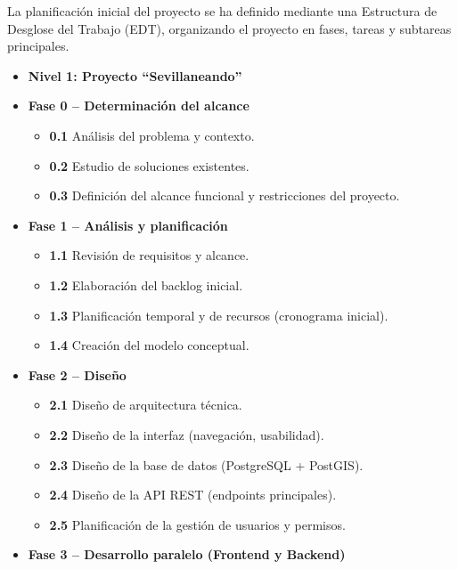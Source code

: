 La planificación inicial del proyecto se ha definido mediante una Estructura de Desglose del Trabajo (EDT), organizando el proyecto en fases, tareas y subtareas principales.

\begin{itemize}
    \item \textbf{Nivel 1: Proyecto ``Sevillaneando''}

    \item \textbf{Fase 0 -- Determinación del alcance}
    \begin{itemize}
        \item \textbf{0.1} Análisis del problema y contexto.
        \item \textbf{0.2} Estudio de soluciones existentes.
        \item \textbf{0.3} Definición del alcance funcional y restricciones del proyecto.
    \end{itemize}

    \item \textbf{Fase 1 -- Análisis y planificación}
    \begin{itemize}
        \item \textbf{1.1} Revisión de requisitos y alcance.
        \item \textbf{1.2} Elaboración del backlog inicial.
        \item \textbf{1.3} Planificación temporal y de recursos (cronograma inicial).
        \item \textbf{1.4} Creación del modelo conceptual.
    \end{itemize}

    \item \textbf{Fase 2 -- Diseño}
    \begin{itemize}
        \item \textbf{2.1} Diseño de arquitectura técnica.
        \item \textbf{2.2} Diseño de la interfaz (navegación, usabilidad).
        \item \textbf{2.3} Diseño de la base de datos (PostgreSQL + PostGIS).
        \item \textbf{2.4} Diseño de la API REST (endpoints principales).
        \item \textbf{2.5} Planificación de la gestión de usuarios y permisos.
    \end{itemize}

    \item \textbf{Fase 3 -- Desarrollo paralelo (Frontend y Backend)}


\end{itemize}
